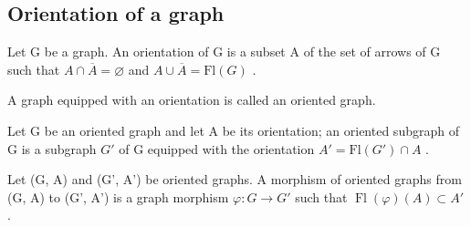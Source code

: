 \subsection{Orientation of a graph}

Let G be a graph. An orientation of G is a subset A of the set of arrows of G such that \(A \cap \overline{A} = \varnothing\) and \(A \cup \overline{A} = \mathrm{Fl}(G)\) .

A graph equipped with an orientation is called an oriented graph.

Let G be an oriented graph and let A be its orientation; an oriented subgraph of G is a subgraph \(G'\) of G equipped with the orientation \(A' = \mathrm{Fl}(G') \cap A\) .

Let (G, A) and (G', A') be oriented graphs. A morphism of oriented graphs from (G, A) to (G', A') is a graph morphism \(\varphi\colon G \to G'\) such that \(\operatorname{Fl}(\varphi)(A) \subset A'\) .

